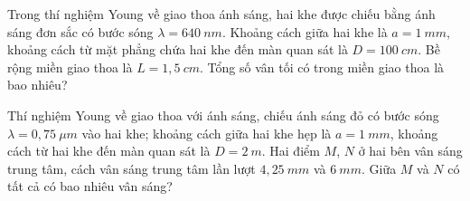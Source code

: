 \begin{ex}
Trong thí nghiệm Young về giao thoa ánh sáng, hai khe được chiếu bằng ánh sáng đơn sắc có bước sóng $\lambda=640\ nm$. Khoảng cách giữa hai khe là $a=1\ mm$, khoảng cách từ mặt phẳng chứa hai khe đến màn quan sát là $D=100\ cm$. Bề rộng miền giao thoa là $L=1,5\ cm$. Tổng số vân tối có trong miền giao thoa là bao nhiêu?
\loigiai{

}
\end{ex}
\begin{ex}
Thí nghiệm Young về giao thoa với ánh sáng, chiếu ánh sáng đỏ có bước sóng $\lambda=0,75\ \mu m$ vào hai khe; khoảng cách giữa hai khe hẹp là $a=1\ mm$, khoảng cách từ hai khe đến màn quan sát là $D=2\ m$. Hai điểm $M$, $N$ ở hai bên vân sáng trung tâm, cách vân sáng trung tâm lần lượt $4,25\ mm$ và $6\ mm$. Giữa $M$ và $N$ có tất cả có bao nhiêu vân sáng? 
\loigiai{
}
\end{ex}
















